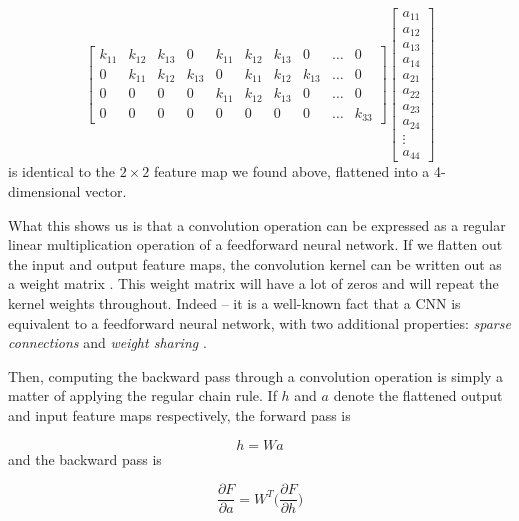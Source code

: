 \documentclass{article}[a4paper]
\begin{document}
\small
\begin{equation*}
	\begin{bmatrix}
		k_{11} & k_{12} & k_{13} & 0 & k_{11} & k_{12} & k_{13} & 0 & \dots & 0 \\
		0 & k_{11} & k_{12} & k_{13} & 0 & k_{11} & k_{12} & k_{13} & \dots & 0 \\
		0 & 0 & 0 & 0 & k_{11} & k_{12} & k_{13} & 0 & \dots & 0 \\
		0 & 0 & 0 & 0 & 0 & 0 & 0 & 0 & \dots & k_{33}
	\end{bmatrix}
	\begin{bmatrix}
		a_{11} \\
		a_{12} \\
		a_{13} \\
		a_{14} \\
		a_{21} \\
		a_{22} \\
		a_{23} \\
		a_{24} \\
		\vdots \\
		a_{44}
	\end{bmatrix}
\end{equation*} \normalsize
is identical to the $2 \times 2$ feature map we found above, flattened into a 4-dimensional vector.

What this shows us is that a convolution operation can be expressed as a regular linear multiplication operation of a feedforward neural network. If we flatten out the input and output feature maps, the convolution kernel can be written out as a weight matrix \cite{dumoulin2016guide}. This weight matrix will have a lot of zeros and will repeat the kernel weights throughout. Indeed -- it is a well-known fact that a CNN is equivalent to a feedforward neural network, with two additional properties: \textit{sparse connections} and \textit{weight sharing} \cite{goodfellow2016deep}.

Then, computing the backward pass through a convolution operation is simply a matter of applying the regular chain rule. If $h$ and $a$ denote the flattened output and input feature maps respectively, the forward pass is

\begin{equation*}
	h = Wa
\end{equation*}
and the backward pass is

\begin{equation}
	\label{transposed-W}
	\frac{\partial F}{\partial a} = W^T \bigg( \frac{\partial F}{\partial h} \bigg)
\end{equation}
\end{document}
